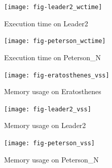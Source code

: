 \documentclass{acm_proc_article-sp}
\begin{document}
\begin{figure}[p]
\centering
\texttt{[image: fig-leader2\_wctime]}
\caption{Execution time on Leader2}
\label{fig-leader2_wctime}
\end{figure}

\begin{figure}[p]
\centering
\texttt{[image: fig-peterson\_wctime]}
\caption{Execution time on Peterson\_N}
\label{fig-peterson_wctime}
\end{figure}

\begin{figure}[p]
\centering
\texttt{[image: fig-eratosthenes\_vss]}
\caption{Memory usage on Eratosthenes}
\label{fig-eratosthenes_vss}
\end{figure}

\begin{figure}[p]
\centering
\texttt{[image: fig-leader2\_vss]}
\caption{Memory usage on Leader2}
\label{fig-leader2_vss}
\end{figure}

\begin{figure}[p]
\centering
\texttt{[image: fig-peterson\_vss]}
\caption{Memory usage on Peterson\_N}
\label{fig-peterson_vss}
\end{figure}
\end{document}
